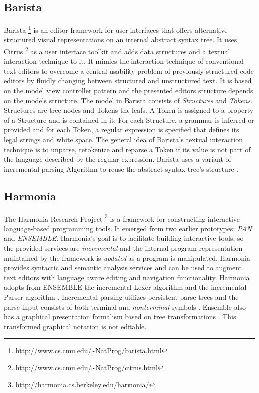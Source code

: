 \subsection{Barista}
Barista \footnote{\raggedright \url{http://www.cs.cmu.edu/~NatProg/barista.html}} is an editor framework for user interfaces that offers alternative structured visual representations on an internal abstract syntax tree. It uses Citrus \footnote{\raggedright \url{http://www.cs.cmu.edu/~NatProg/citrus.html}} as a user interface toolkit \cite{citrus} and adds data structures and a textual interaction technique to it. It mimics the interaction technique of conventional text editors to overcome a central usability problem of previously structured code editors by fluidly changing between structured and unstructured text. It is based on the model view controller pattern \cite{patterns} and the presented editors structure depends on the models structure. The model in Barista consists of \emph{Structures} and \emph{Tokens}. Structures are tree nodes and Tokens the leafs. A Token is assigned to a property of a Structure and is contained in it. For each Structure, a grammar is inferred or provided and for each Token, a regular expression is specified that defines its legal strings and white space. The general idea of Barista's textual interaction technique is to unparse, retokenize and reparse a Token if its value is not part of the language described by the regular expression. Barista uses a variant of \cite{iglrPaper} incremental parsing Algorithm to reuse the abstract syntax tree's structure \cite{Barista}. 

\subsection{Harmonia}
The Harmonia Research Project \footnote{\raggedright \url{http://harmonia.cs.berkeley.edu/harmonia/}} is a framework for constructing interactive
language-based programming tools. It emerged from two earlier prototypes: \emph{PAN} and \emph{ENSEMBLE}. Harmonia's goal is to facilitate building interactive tools, so the provided services are \emph{incremental} and the internal program representation maintained by the framework is \emph{updated} as a program is manipulated. Harmonia provides syntactic and semantic analysis services \cite{harmonia} and can be used to augment text editors with language aware editing and navigation functionality. Harmonia adopts from ENSEMBLE the incremental Lexer algorithm \cite{ilex} and the incremental Parser algorithm \cite{iglrPaper}. Incremental parsing utilizes persistent parse trees and the parse input consists of both terminal and \emph{nonterminal} symbols \cite{iglrPaper}. Ensemble also has a graphical presentation formalism based on tree transformations \cite{ensemble}. This transformed graphical notation is not editable.

